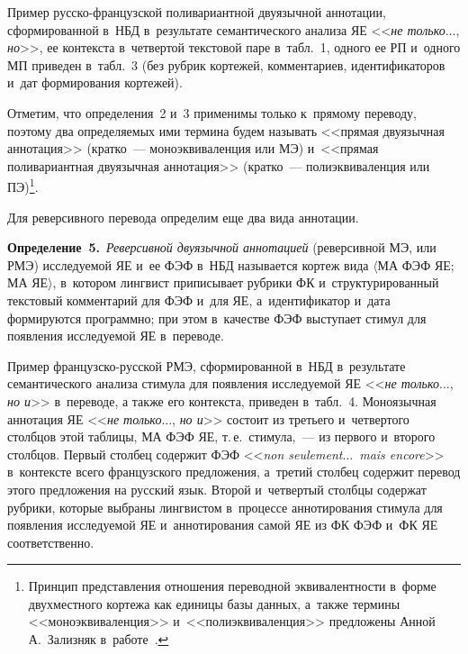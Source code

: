 \begin{multicols}{2}
   
   Пример русско-французской поливариантной двуязычной аннотации, 
сформированной в~НБД в~результате семантического анализа ЯЕ <<\textit{не 
только}$\ldots$, \textit{но}>>, ее контекста в~четвертой текстовой паре  
в~табл.~1, одного ее РП и~одного МП приведен в~табл.~3 (без рубрик кортежей, 
комментариев, идентификаторов и~дат формирования кортежей).
   
   Отметим, что определения~2 и~3 применимы только к~прямому переводу, 
поэтому два определяемых ими термина будем называть <<прямая двуязычная 
аннотация>> (кратко~--- моноэквиваленция или МЭ) и~<<прямая 
поливариантная двуязычная аннотация>> (кратко~--- полиэквиваленция или 
ПЭ)\footnote{Принцип представления отношения переводной эквивалентности в~форме 
двухместного кортежа как единицы базы данных, а~также термины <<моноэквиваленция>> 
и~<<полиэквиваленция>> предложены Анной А.~Зализняк в~работе~\cite{8-zat}.}.



   
   Для реверсивного перевода определим еще два вида аннотации.
   
   \smallskip
   
   \noindent
   \textbf{Определение~5.}\ \textit{Реверсивной двуязычной аннотацией} 
(реверсивной МЭ, или РМЭ) исследуемой ЯЕ
и~ее ФЭФ в~НБД называется кортеж вида $\langle$МА ФЭФ ЯЕ; МА 
ЯЕ$\rangle$, в~котором лингвист приписывает рубрики ФК
 и~структурированный текстовый комментарий для ФЭФ и~для 
ЯЕ, а~идентификатор и~дата формируются программно; при этом в~качестве 
ФЭФ выступает стимул для появления исследуемой ЯЕ в~переводе.
   
   Пример французско-рус\-ской РМЭ, сформированной в~НБД в~результате 
семантического анализа стимула для появления исследуемой ЯЕ <<\textit{не 
только}$\ldots$, \textit{но и}>> в~переводе, а также его контекста, приведен 
в~табл.~4. Моноязычная аннотация ЯЕ <<\textit{не только}$\ldots$, \textit{но и}>>  
со\-сто\-ит из 
третьего и~четвертого столбцов этой таблицы, МА ФЭФ ЯЕ, т.\,е.\ стимула,~--- 
из первого и~второго столб\-цов. Первый стол\-бец содержит ФЭФ <<\textit{non 
seulement}$\ldots$\ \textit{mais encore}>> в~контексте всего французского 
предложения, а~третий стол\-бец содержит перевод этого предложения на 
русский язык. Второй и~четвертый столб\-цы содержат руб\-ри\-ки, которые 
выбраны лингвистом в~процессе аннотирования стимула для появления 
ис\-сле\-дуе\-мой ЯЕ и~аннотирования самой ЯЕ из ФК ФЭФ и~ФК ЯЕ 
соответственно.
   
   

   
   \smallskip
   

\end{multicols}
